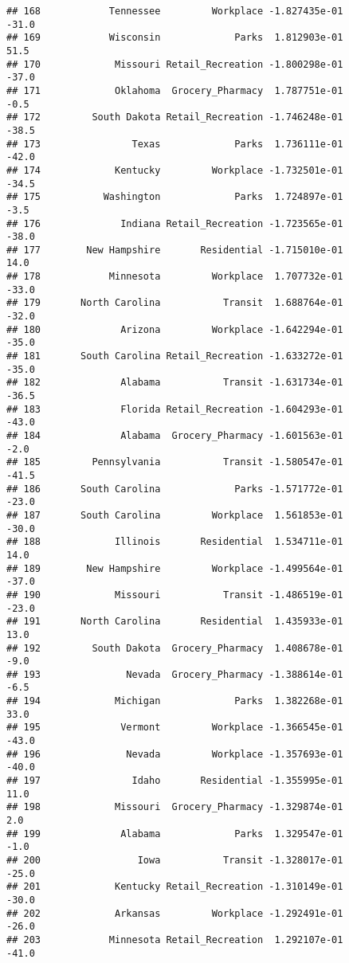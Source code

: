 \documentclass[]{article}
\begin{document}
\begin{verbatim}
## 168            Tennessee         Workplace -1.827435e-01         -31.0
## 169            Wisconsin             Parks  1.812903e-01          51.5
## 170             Missouri Retail_Recreation -1.800298e-01         -37.0
## 171             Oklahoma  Grocery_Pharmacy  1.787751e-01          -0.5
## 172         South Dakota Retail_Recreation -1.746248e-01         -38.5
## 173                Texas             Parks  1.736111e-01         -42.0
## 174             Kentucky         Workplace -1.732501e-01         -34.5
## 175           Washington             Parks  1.724897e-01          -3.5
## 176              Indiana Retail_Recreation -1.723565e-01         -38.0
## 177        New Hampshire       Residential -1.715010e-01          14.0
## 178            Minnesota         Workplace  1.707732e-01         -33.0
## 179       North Carolina           Transit  1.688764e-01         -32.0
## 180              Arizona         Workplace -1.642294e-01         -35.0
## 181       South Carolina Retail_Recreation -1.633272e-01         -35.0
## 182              Alabama           Transit -1.631734e-01         -36.5
## 183              Florida Retail_Recreation -1.604293e-01         -43.0
## 184              Alabama  Grocery_Pharmacy -1.601563e-01          -2.0
## 185         Pennsylvania           Transit -1.580547e-01         -41.5
## 186       South Carolina             Parks -1.571772e-01         -23.0
## 187       South Carolina         Workplace  1.561853e-01         -30.0
## 188             Illinois       Residential  1.534711e-01          14.0
## 189        New Hampshire         Workplace -1.499564e-01         -37.0
## 190             Missouri           Transit -1.486519e-01         -23.0
## 191       North Carolina       Residential  1.435933e-01          13.0
## 192         South Dakota  Grocery_Pharmacy  1.408678e-01          -9.0
## 193               Nevada  Grocery_Pharmacy -1.388614e-01          -6.5
## 194             Michigan             Parks  1.382268e-01          33.0
## 195              Vermont         Workplace -1.366545e-01         -43.0
## 196               Nevada         Workplace -1.357693e-01         -40.0
## 197                Idaho       Residential -1.355995e-01          11.0
## 198             Missouri  Grocery_Pharmacy -1.329874e-01           2.0
## 199              Alabama             Parks  1.329547e-01          -1.0
## 200                 Iowa           Transit -1.328017e-01         -25.0
## 201             Kentucky Retail_Recreation -1.310149e-01         -30.0
## 202             Arkansas         Workplace -1.292491e-01         -26.0
## 203            Minnesota Retail_Recreation  1.292107e-01         -41.0

\end{verbatim}
\end{document}
